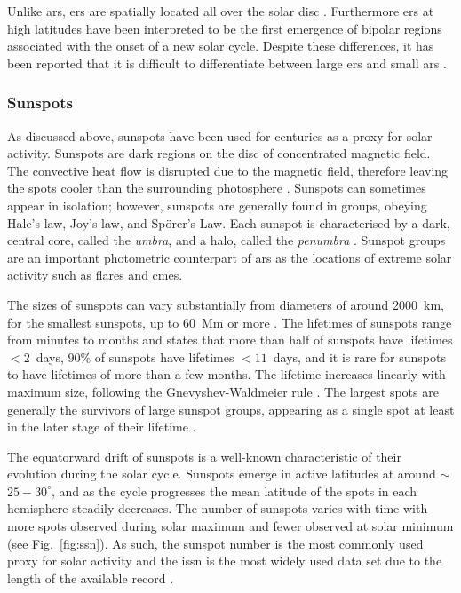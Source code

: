 Unlike \glspl{ar}, \glspl{er} are spatially located all over the solar disc \citep{harvey_solar_2001}. Furthermore \glspl{er} at high latitudes have been interpreted to be the first emergence of bipolar regions associated with the onset of a new solar cycle. Despite these differences, it has been reported that it is difficult to differentiate between large \glspl{er} and small \glspl{ar} \citep{harvey_solar_2001}.



\glsresetall 
{}
\subsubsection*{Sunspots}

As discussed above, sunspots have been used for centuries as a proxy for solar activity. Sunspots are dark regions on the disc of concentrated magnetic field. The convective heat flow is disrupted due to the magnetic field, therefore leaving the spots cooler than the surrounding photosphere \citep{solanki_sunspots_2003, hathaway_solar_2015}. Sunspots can sometimes appear in isolation; however, sunspots are generally found in groups, obeying Hale's law, Joy's law, and Sp\"{o}rer's Law. Each sunspot
is characterised by a dark, central core, called the \textit{umbra}, and a halo, called the \textit{penumbra} \citep{howard_sunspot_2001, solanki_sunspots_2003}. Sunspot groups are an important photometric counterpart of \glspl{ar} as the locations of extreme solar activity such as flares and \glspl{cme}.

The sizes of sunspots can vary substantially from diameters of around 2000~km, for the smallest sunspots, up to 60~Mm or more \citep{howard_sunspot_2001,solanki_sunspots_2003}. The lifetimes of sunspots range from minutes to months \citep{howard_sunspot_2001, solanki_sunspots_2003} and \citet{howard_sunspot_2001} states that more than half of sunspots have lifetimes $<2$~days, $90\%$ of sunspots have lifetimes $<11$~days, and it is rare for sunspots to have lifetimes of more than a few months. The lifetime increases linearly with maximum size, following the Gnevyshev-Waldmeier rule \citep{gnevyshev_notitle_1938, waldmeier_ergebnisse_1955}. The largest spots are generally the survivors of large sunspot groups, appearing as a single spot at least in the later stage of their lifetime \citep{howard_sunspot_2001}.

The equatorward drift of sunspots is a well-known characteristic of their evolution during the solar cycle. Sunspots emerge in active latitudes at around $\sim$$25-30^{\circ}$, and as the cycle progresses the mean latitude of the spots in each hemisphere steadily decreases. The number of sunspots varies with time with more spots observed during solar maximum and fewer observed at solar minimum (see Fig.~\ref{fig:ssn}). As such, the sunspot number is the most commonly used proxy for solar activity \citep{hathaway_solar_2015} and the \gls{issn} is the most widely used data set due to the length of the available record \citep{hathaway_solar_2015}. 

